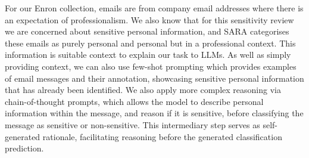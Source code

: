 For our Enron collection, emails are from company email addresses where there is an expectation of professionalism. We also know that for this sensitivity review we are concerned about sensitive personal information, and SARA categorises these emails as purely personal and personal but in a professional context. This information is suitable context to explain our task to LLMs. As well as simply providing context, we can also use few-shot prompting which provides examples of email messages and their annotation, showcasing sensitive personal information that has already been identified. We also apply more complex reasoning via chain-of-thought prompts, which allows the model to describe personal information within the message, and reason if it is sensitive, before classifying the message as sensitive or non-sensitive. This intermediary step serves as self-generated rationale, facilitating reasoning before the generated classification prediction.

